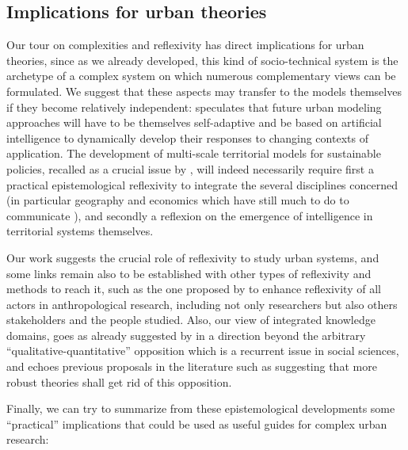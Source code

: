 \subsection{Implications for urban theories}


Our tour on complexities and reflexivity has direct implications for urban theories, since as we already developed, this kind of socio-technical system is the archetype of a complex system on which numerous complementary views can be formulated. We suggest that these aspects may transfer to the models themselves if they become relatively independent: \cite{white2017necessity} speculates that future urban modeling approaches will have to be themselves self-adaptive and be based on artificial intelligence to dynamically develop their responses to changing contexts of application. The development of multi-scale territorial models for sustainable policies, recalled as a crucial issue by \cite{rozenblat2018conclusion}, will indeed necessarily require first a practical epistemological reflexivity to integrate the several disciplines concerned (in particular geography and economics which have still much to do to communicate \cite{raimbault2017invisible}), and secondly a reflexion on the emergence of intelligence in territorial systems themselves.

Our work suggests the crucial role of reflexivity to study urban systems, and some links remain also to be established with other types of reflexivity and methods to reach it, such as the one proposed by \cite{anzoise2017perception} to enhance reflexivity of all actors in anthropological research, including not only researchers but also others stakeholders and the people studied. Also, our view of integrated knowledge domains, goes as already suggested by \cite{raimbault2017cadre} in a direction beyond the arbitrary ``qualitative-quantitative'' opposition which is a recurrent issue in social sciences, and echoes previous proposals in the literature such as \cite{shah2006building} suggesting that more robust theories shall get rid of this opposition.

Finally, we can try to summarize from these epistemological developments some  ``practical'' implications that could be used as useful guides for complex urban research:

